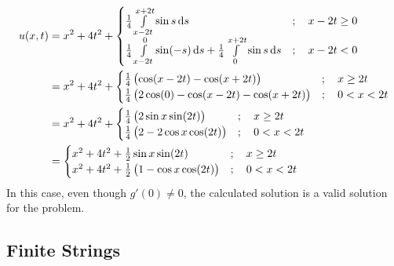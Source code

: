 \documentclass[titlepage, fleqn, a4paper, 12pt, twoside]{article}
\theoremstyle{definition}
\theoremstyle{theorem}
\begin{document}
\begin{solution}
\begin{align*}
		u(x,t) &= x^2 + 4 t^2 + 
			\begin{cases}
				\frac{1}{4} \int\limits_{x - 2 t}^{x + 2 t} \sin s \dif s                                                   & ;\quad x - 2 t \ge 0 \\
				\frac{1}{4} \int\limits_{x - 2 t}^{0} \sin(-s) \dif s + \frac{1}{4} \int\limits_{0}^{x + 2 t} \sin s \dif s & ;\quad x - 2 t < 0   \\
			\end{cases}\\
		&= x^2 + 4 t^2 +
			\begin{cases}
				\frac{1}{4} \left( \cos(x - 2 t) - \cos(x + 2 t) \right)             & ;\quad x \ge 2 t   \\
				\frac{1}{4} \left( 2 \cos(0) - \cos(x - 2 t) - \cos(x + 2 t) \right) & ;\quad 0 < x < 2 t \\
			\end{cases}\\
		&= x^2 + 4 t^2 +
			\begin{cases}
				\frac{1}{4} \left( 2 \sin x \sin(2 t) \right)     & ;\quad x \ge 2 t   \\
				\frac{1}{4} \left( 2 - 2 \cos x \cos(2 t) \right) & ;\quad 0 < x < 2 t \\
			\end{cases}\\
		&=
			\begin{cases}
				x^2 + 4 t^2 + \frac{1}{2} \sin x \sin(2 t)                    & ;\quad x \ge 2 t   \\
				x^2 + 4 t^2 + \frac{1}{2} \left( 1 - \cos x \cos(2 t) \right) & ;\quad 0 < x < 2 t \\
			\end{cases}
	\end{align*}
	In this case, even though $g'(0) \neq 0$, the calculated solution is a valid solution for the problem.
\end{solution}

\subsection{Finite Strings}
\end{document}
